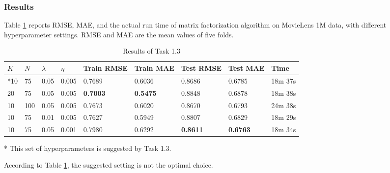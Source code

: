 \documentclass[12pt]{article}
\begin{document}
\subsubsection{Results}
Table \ref{tab:1.3-results} reports RMSE, MAE, and the actual run time of matrix factorization algorithm on MovieLens 1M data, with different hyperparameter settings. RMSE and MAE are the mean values of five folds.
\begin{table}[ht]
    \centering
    \caption{Results of Task 1.3}
    \label{tab:1.3-results}
    \begin{threeparttable}
    \begin{tabular}{lllllllll}
        \toprule
        \textbf{$K$} & \textbf{$N$} & \textbf{$\lambda$} & \textbf{$\eta$} & \textbf{Train RMSE} & \textbf{Train MAE} & \textbf{Test RMSE} & \textbf{Test MAE} & \textbf{Time}\\
        \midrule
        *10 & 75 & 0.05 & 0.005 & 0.7689 & 0.6036 & 0.8686 & 0.6785 & 18m 37s\\
        20 & 75 & 0.05 & 0.005 & \textbf{0.7003} & \textbf{0.5475} & 0.8848 & 0.6878 & 18m 38s\\
        10 & 100 & 0.05 & 0.005 & 0.7673 & 0.6020 & 0.8670 & 0.6793 & 24m 38s\\
        10 & 75 & 0.01 & 0.005 & 0.7627 & 0.5949 & 0.8807 & 0.6829 & 18m 29s\\
        10 & 75 & 0.05 & 0.001 & 0.7980 & 0.6292 & \textbf{0.8611} & \textbf{0.6763} & 18m 34s\\
        \bottomrule
    \end{tabular}
    \begin{tablenotes}
        \footnotesize
        \item[*] This set of hyperparameters is suggested by Task 1.3.
    \end{tablenotes}
    \end{threeparttable}
\end{table}
\par
According to Table \ref{tab:1.3-results}, the suggested setting is not the optimal choice.
\end{document}
